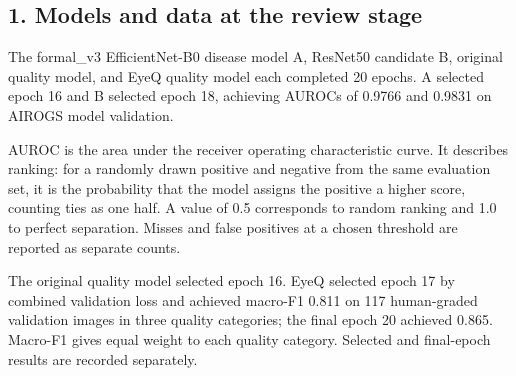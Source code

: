 \documentclass[
  10pt,
]{article}
\begin{document}
\subsection{1. Models and data at the review
stage}\label{models-and-data-at-the-review-stage}

The formal\_v3 EfficientNet-B0 disease model A, ResNet50 candidate B,
original quality model, and EyeQ quality model each completed 20 epochs.
A selected epoch 16 and B selected epoch 18, achieving AUROCs of 0.9766
and 0.9831 on AIROGS model validation.

AUROC is the area under the receiver operating characteristic curve. It
describes ranking: for a randomly drawn positive and negative from the
same evaluation set, it is the probability that the model assigns the
positive a higher score, counting ties as one half. A value of 0.5
corresponds to random ranking and 1.0 to perfect separation. Misses and
false positives at a chosen threshold are reported as separate counts.

The original quality model selected epoch 16. EyeQ selected epoch 17 by
combined validation loss and achieved macro-F1 0.811 on 117 human-graded
validation images in three quality categories; the final epoch 20
achieved 0.865. Macro-F1 gives equal weight to each quality category.
Selected and final-epoch results are recorded separately.
\end{document}
